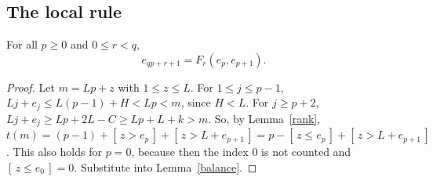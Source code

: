 \documentclass[11pt]{article}
\theoremstyle{remark}\newtheorem{remark}[theorem]{Remark}
\theoremstyle{definition}\newtheorem{definition}[theorem]{Definition}
\newcommand{\ind}[1]{[\,#1\,]}
\begin{document}
\subsection{The local rule}
\begin{proposition}\label{prop:local}
For all \(p\ge0\) and \(0\le r<q\),
\begin{equation}\label{eq:local}
e_{qp+r+1}=F_r(e_p,e_{p+1}).
\end{equation}
\end{proposition}
\begin{proof}
Let \(m=Lp+z\) with \(1\le z\le L\). For \(1\le j\le p-1\), \(Lj+e_j\le L(p-1)+H<Lp<m\), since \(H<L\). For \(j\ge p+2\), \(Lj+e_j\ge Lp+2L-C\ge Lp+L+k>m\). So, by Lemma~\ref{rank},
\(t(m)=(p-1)+\ind{z>e_p}+\ind{z>L+e_{p+1}}=p-\ind{z\le e_p}+\ind{z>L+e_{p+1}}\).
This also holds for \(p=0\), because then the index \(0\) is not counted and \(\ind{z\le e_0}=0\). Substitute into Lemma~\ref{balance}.
\end{proof}
\end{document}
